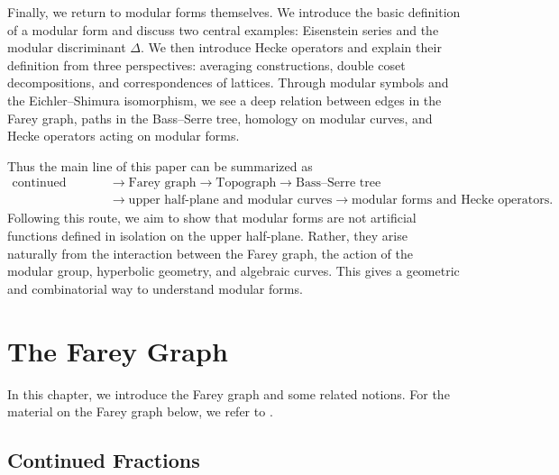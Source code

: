 \documentclass[10pt, a4paper]{article}
\theoremstyle{definition}
\theoremstyle{remark}
\begin{document}
Finally, we return to modular forms themselves. We introduce the basic definition of a modular form and discuss two central examples: Eisenstein series and the modular discriminant \(\Delta\). We then introduce Hecke operators and explain their definition from three perspectives: averaging constructions, double coset decompositions, and correspondences of lattices. Through modular symbols and the Eichler--Shimura isomorphism, we  see a deep relation between edges in the Farey graph, paths in the Bass--Serre tree, homology on modular curves, and Hecke operators acting on modular forms.

Thus the main line of this paper can be summarized as
\[
\begin{aligned}
\text{continued fractions}
&\longrightarrow \text{Farey graph}
\longrightarrow \text{Topograph}
\longrightarrow \text{Bass--Serre tree} \\
&\longrightarrow \text{upper half-plane and modular curves}
\longrightarrow \text{modular forms and Hecke operators}.
\end{aligned}
\]
Following this route, we aim to show that modular forms are not artificial functions defined in isolation on the upper half-plane. Rather, they arise naturally from the interaction between the Farey graph, the action of the modular group, hyperbolic geometry, and algebraic curves. This gives a geometric and combinatorial way to understand modular forms.


\section{The Farey Graph}\label{sec:farey}

In this chapter, we introduce the Farey graph and some related notions. For the material on the Farey graph below, we refer to \cite{HatcherTopologyOfNumbers}.

\subsection{Continued Fractions}
\end{document}
